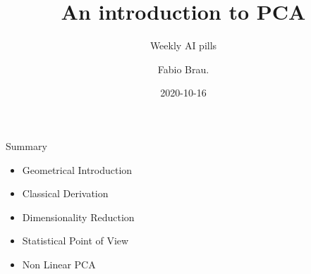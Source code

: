\documentclass[10pt]{beamer}
\title{An introduction to PCA}
\subtitle{Weekly AI pills}
\date{2020-10-16}
\author{Fabio Brau.}
\institute{SSSA, Emerging Digital Technologies, Pisa.}
\theoremstyle{definition}
\newcommand{\1}{\mathbbm{1}}
\begin{document}
{%
\maketitle
}
\begin{frame}{Summary}
  \begin{itemize}
    \item Geometrical Introduction
    \item Classical Derivation
    \item Dimensionality Reduction
    \item Statistical Point of View
    \item Non Linear PCA
  \end{itemize}
\end{frame}
\end{document}
